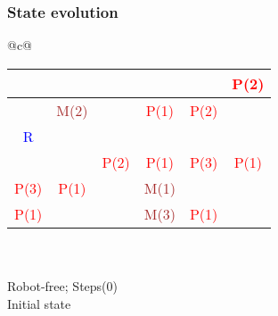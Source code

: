 \subsubsection{State evolution}

		\begin{multicols}{3}
		\centering
		\tiny
	

		\begin{tabular}[c]{@{}c@{}}
			\setlength\tabcolsep{3pt}
			\begin{tabular}{|c|c|c|c|c|c|}
				\hline
					&		&		&		&		&	\textcolor{red}{P(2)} \\ \hline
					&	\textcolor{brown}{M(2)}	&		&	\textcolor{red}{P(1)}	&	\textcolor{red}{P(2)}	&	 \\ \hline
				\textcolor{blue}{R}	&		&		&		&		&	 \\ \hline
					&		&	\textcolor{red}{P(2)}	&	\textcolor{red}{P(1)}	&	\textcolor{red}{P(3)}	&	\textcolor{red}{P(1)} \\ \hline
				\textcolor{red}{P(3)}	&	\textcolor{red}{P(1)}	&		&	\textcolor{brown}{M(1)}	&		&	 \\ \hline
				\textcolor{red}{P(1)}	&		&		&	\textcolor{brown}{M(3)}	&	\textcolor{red}{P(1)}	&	 \\ \hline
			\end{tabular}
			\\
			\\
			Robot-free; Steps(0)
			\\
			Initial state
			\\
			\\
			\\
		\end{tabular}
	



\end{multicols}
